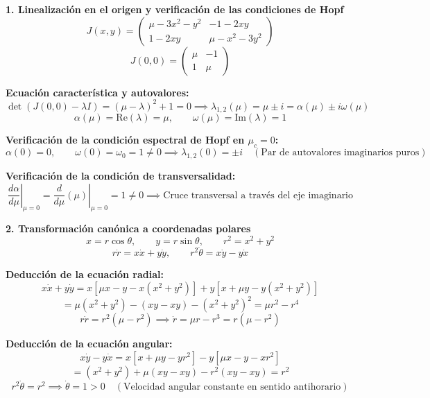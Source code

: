 \documentclass[11pt,a4paper]{article}
\newenvironment{solucion}[1][Solución Detallada]{%
    \vspace{1.5mm}%
    \noindent{\large\textbf{Solución:}}\par\vspace{1.5mm}%
}{%
    \par\vspace{3mm}%
}
\begin{document}
\begin{solucion}

\textbf{\large 1. Linealización en el origen y verificación de las condiciones de Hopf}
\[
J(x, y) = \begin{pmatrix} \mu - 3x^2 - y^2 & -1 - 2xy \\ 1 - 2xy & \mu - x^2 - 3y^2 \end{pmatrix}
\]
\[
J(0, 0) = \begin{pmatrix} \mu & -1 \\ 1 & \mu \end{pmatrix}
\]

\textbf{Ecuación característica y autovalores:}
\[
\det(J(0,0) - \lambda I) = (\mu - \lambda)^2 + 1 = 0 \implies \lambda_{1,2}(\mu) = \mu \pm i = \alpha(\mu) \pm i\omega(\mu)
\]
\[
\boxed{\alpha(\mu) = \mathrm{Re}(\lambda) = \mu, \qquad \omega(\mu) = \mathrm{Im}(\lambda) = 1}
\]

\textbf{Verificación de la condición espectral de Hopf en $\mu_c = 0$:}
\[
\alpha(0) = 0, \qquad \omega(0) = \omega_0 = 1 \neq 0 \implies \boxed{\lambda_{1,2}(0) = \pm i \quad (\text{Par de autovalores imaginarios puros})}
\]

\textbf{Verificación de la condición de transversalidad:}
\[
\left.\frac{d\alpha}{d\mu}\right|_{\mu = 0} = \left.\frac{d}{d\mu}(\mu)\right|_{\mu = 0} = 1 \neq 0 \implies \boxed{\text{Cruce transversal a través del eje imaginario}}
\]

\vspace{3.5mm}

\textbf{\large 2. Transformación canónica a coordenadas polares}
\[
x = r\cos\theta, \qquad y = r\sin\theta, \qquad r^2 = x^2 + y^2
\]
\[
r\dot{r} = x\dot{x} + y\dot{y}, \qquad r^2\dot{\theta} = x\dot{y} - y\dot{x}
\]

\textbf{Deducción de la ecuación radial:}
\[
x\dot{x} + y\dot{y} = x\left[\mu x - y - x(x^2 + y^2)\right] + y\left[x + \mu y - y(x^2 + y^2)\right]
\]
\[
= \mu(x^2 + y^2) - (xy - xy) - (x^2 + y^2)^2 = \mu r^2 - r^4
\]
\[
r\dot{r} = r^2(\mu - r^2) \implies \boxed{\dot{r} = \mu r - r^3 = r(\mu - r^2)}
\]

\textbf{Deducción de la ecuación angular:}
\[
x\dot{y} - y\dot{x} = x\left[x + \mu y - y r^2\right] - y\left[\mu x - y - x r^2\right]
\]
\[
= (x^2 + y^2) + \mu(xy - xy) - r^2(xy - xy) = r^2
\]
\[
r^2\dot{\theta} = r^2 \implies \boxed{\dot{\theta} = 1 > 0 \quad (\text{Velocidad angular constante en sentido antihorario})}
\]

\vspace{3.5mm}


\end{solucion}
\end{document}
